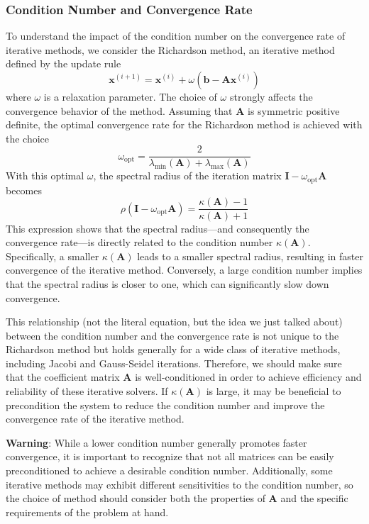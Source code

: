 \subsubsection{Condition Number and Convergence Rate}
To understand the impact of the condition number on the convergence rate of iterative methods, we consider the Richardson method, an iterative method defined by the update rule
\begin{equation*}
    \mathbf{x}^{(i+1)} = \mathbf{x}^{(i)} + \omega (\mathbf{b} - \mathbf{A}\mathbf{x}^{(i)})
\end{equation*}
where $\omega$ is a relaxation parameter. The choice of $\omega$ strongly affects the convergence behavior of the method. Assuming that $\mathbf{A}$ is symmetric positive definite, the optimal convergence rate for the Richardson method is achieved with the choice
\begin{equation*}
    \omega_{\text{opt}} = \frac{2}{\lambda_{\min}(\mathbf{A}) + \lambda_{\max}(\mathbf{A})}
\end{equation*}
With this optimal $\omega$, the spectral radius of the iteration matrix $\mathbf{I} - \omega_{\text{opt}} \mathbf{A}$ becomes
\begin{equation*}
    \rho(\mathbf{I} - \omega_{\text{opt}} \mathbf{A}) = \frac{\kappa(\mathbf{A}) - 1}{\kappa(\mathbf{A}) + 1}
\end{equation*}
This expression shows that the spectral radius---and consequently the convergence rate---is directly related to the condition number $\kappa(\mathbf{A})$. Specifically, a smaller $\kappa(\mathbf{A})$ leads to a smaller spectral radius, resulting in faster convergence of the iterative method. Conversely, a large condition number implies that the spectral radius is closer to one, which can significantly slow down convergence.

This relationship (not the literal equation, but the idea we just talked about) between the condition number and the convergence rate is not unique to the Richardson method but holds generally for a wide class of iterative methods, including Jacobi and Gauss-Seidel iterations. Therefore, we should make sure that the coefficient matrix $\mathbf{A}$ is well-conditioned in order to achieve efficiency and reliability of these iterative solvers. If $\kappa(\mathbf{A})$ is large, it may be beneficial to precondition the system to reduce the condition number and improve the convergence rate of the iterative method.

\begin{warningBox}
    \textbf{Warning}: While a lower condition number generally promotes faster convergence, it is important to recognize that not all matrices can be easily preconditioned to achieve a desirable condition number. Additionally, some iterative methods may exhibit different sensitivities to the condition number, so the choice of method should consider both the properties of $\mathbf{A}$ and the specific requirements of the problem at hand.
\end{warningBox}

